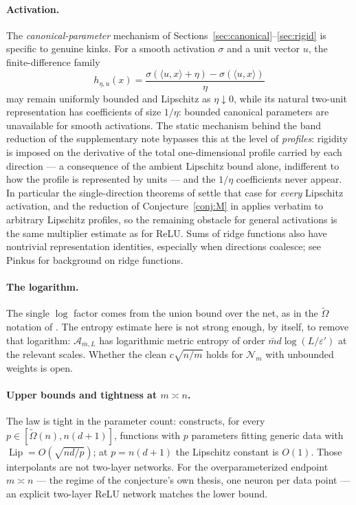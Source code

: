 \documentclass[11pt,reqno]{amsart}
\theoremstyle{plain}
\theoremstyle{definition}
\theoremstyle{remark}
\newcommand{\eps}{\varepsilon}
\newcommand{\Lip}{\operatorname{Lip}}
\newcommand{\NN}{\mathcal{N}}
\newcommand{\AAA}{\mathcal{A}}
\newcommand{\inn}[2]{\langle #1,#2\rangle}
\begin{document}
\paragraph{Activation.} The \emph{canonical-parameter} mechanism of Sections~\ref{sec:canonical}--\ref{sec:rigid} is specific to genuine kinks. For a smooth activation $\sigma$ and a unit vector $u$, the finite-difference family
\[
        h_{\eta,u}(x)=\frac{\sigma(\inn ux+\eta)-\sigma(\inn ux)}{\eta}
\]
may remain uniformly bounded and Lipschitz as $\eta\downarrow0$, while its natural two-unit representation has coefficients of size $1/\eta$: bounded canonical parameters are unavailable for smooth activations. The static mechanism behind the band reduction of the supplementary note \cite{supp} bypasses this at the level of \emph{profiles}: rigidity is imposed on the derivative of the total one-dimensional profile carried by each direction --- a consequence of the ambient Lipschitz bound alone, indifferent to how the profile is represented by units --- and the $1/\eta$ coefficients never appear. In particular the single-direction theorems of \cite{supp} settle that case for \emph{every} Lipschitz activation, and the reduction of Conjecture~\ref{conj:M} in \cite{supp} applies verbatim to arbitrary Lipschitz profiles, so the remaining obstacle for general activations is the same multiplier estimate as for ReLU. Sums of ridge functions also have nontrivial representation identities, especially when directions coalesce; see Pinkus \cite{Pinkus} for background on ridge functions.

\paragraph{The logarithm.} The single $\log$ factor comes from the union bound over the net, as in the $\widetilde\Omega$ notation of \cite{BS,BLN}. The entropy estimate here is not strong enough, by itself, to remove that logarithm: $\AAA_{\bar m,L}$ has logarithmic metric entropy of order $\bar md\log(L/\eps')$ at the relevant scales. Whether the clean $c\sqrt{n/m}$ holds for $\NN_m$ with unbounded weights is open.

\paragraph{Upper bounds and tightness at $m\asymp n$.} The law is tight in the parameter count: \cite[Remark~1.1]{BS} constructs, for every $p\in[\widetilde\Omega(n),n(d+1)]$, functions with $p$ parameters fitting generic data with $\Lip=O(\sqrt{nd/p})$; at $p=n(d+1)$ the Lipschitz constant is $O(1)$. Those interpolants are not two-layer networks. For the overparameterized endpoint $m\asymp n$ --- the regime of the conjecture's own thesis, one neuron per data point --- an explicit two-layer ReLU network matches the lower bound.
\end{document}
